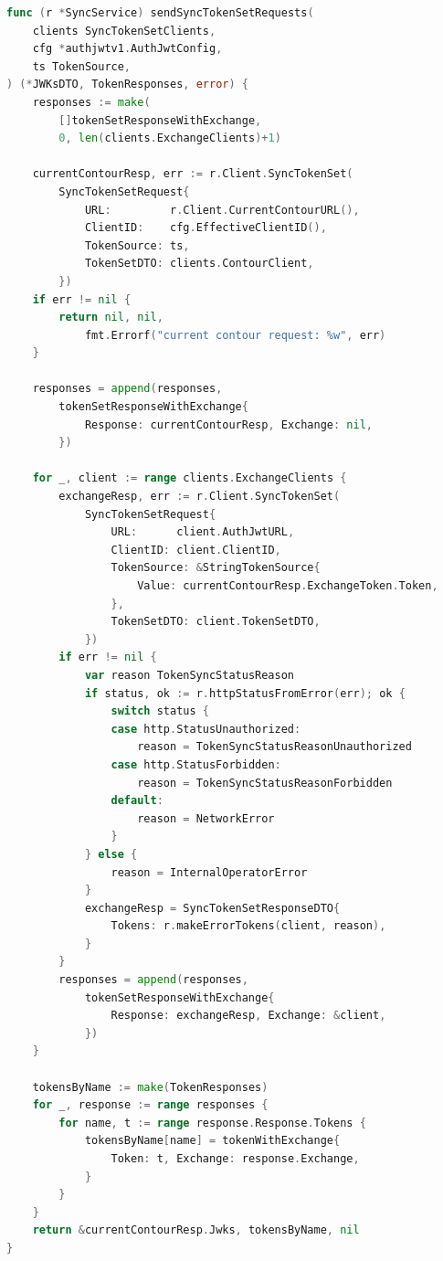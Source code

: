 \begin{lstlisting}[language=Go,
  label={lst:app-sync-service},
  caption={Двухфазная синхронизация токенов в Kubernetes-операторе}]
func (r *SyncService) sendSyncTokenSetRequests(
    clients SyncTokenSetClients,
    cfg *authjwtv1.AuthJwtConfig,
    ts TokenSource,
) (*JWKsDTO, TokenResponses, error) {
    responses := make(
        []tokenSetResponseWithExchange,
        0, len(clients.ExchangeClients)+1)

    currentContourResp, err := r.Client.SyncTokenSet(
        SyncTokenSetRequest{
            URL:         r.Client.CurrentContourURL(),
            ClientID:    cfg.EffectiveClientID(),
            TokenSource: ts,
            TokenSetDTO: clients.ContourClient,
        })
    if err != nil {
        return nil, nil,
            fmt.Errorf("current contour request: %w", err)
    }

    responses = append(responses,
        tokenSetResponseWithExchange{
            Response: currentContourResp, Exchange: nil,
        })

    for _, client := range clients.ExchangeClients {
        exchangeResp, err := r.Client.SyncTokenSet(
            SyncTokenSetRequest{
                URL:      client.AuthJwtURL,
                ClientID: client.ClientID,
                TokenSource: &StringTokenSource{
                    Value: currentContourResp.ExchangeToken.Token,
                },
                TokenSetDTO: client.TokenSetDTO,
            })
        if err != nil {
            var reason TokenSyncStatusReason
            if status, ok := r.httpStatusFromError(err); ok {
                switch status {
                case http.StatusUnauthorized:
                    reason = TokenSyncStatusReasonUnauthorized
                case http.StatusForbidden:
                    reason = TokenSyncStatusReasonForbidden
                default:
                    reason = NetworkError
                }
            } else {
                reason = InternalOperatorError
            }
            exchangeResp = SyncTokenSetResponseDTO{
                Tokens: r.makeErrorTokens(client, reason),
            }
        }
        responses = append(responses,
            tokenSetResponseWithExchange{
                Response: exchangeResp, Exchange: &client,
            })
    }

    tokensByName := make(TokenResponses)
    for _, response := range responses {
        for name, t := range response.Response.Tokens {
            tokensByName[name] = tokenWithExchange{
                Token: t, Exchange: response.Exchange,
            }
        }
    }
    return &currentContourResp.Jwks, tokensByName, nil
}
\end{lstlisting}

